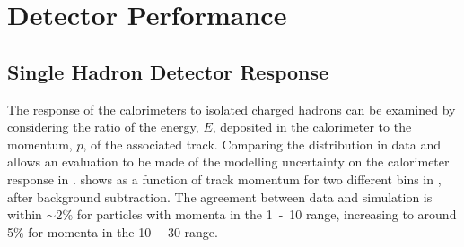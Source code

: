 \section{Detector Performance}
\subsection{Single Hadron Detector Response}
\label{sec:detector:single-particle}
The response of the calorimeters to isolated charged hadrons can be examined by
considering the ratio of the energy, $E$, deposited in the calorimeter to the momentum,
$p$, of the associated track. Comparing the  distribution in data and
\MC allows an evaluation to be made of the modelling uncertainty on the calorimeter
response in \MC.  shows
 as a function of track momentum for two different bins in \absEta,
after background subtraction. The agreement between data and \MC simulation is
within $\sim2\%$ for particles with momenta in the \unit{1-10}{\GeV} range, increasing
to around 5\% for momenta in the \unit{10-30}{\GeV} range.

